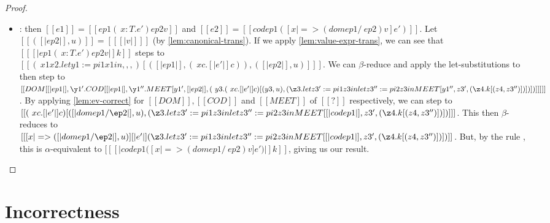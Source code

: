 \documentclass[11pt]{article}
\newcommand{\rrule}[1]{\rref*{#1}}
\begin{document}
\begin{proof}
\begin{itemize}
		\item \rrule{RedAppEv}: then $[[e1]] = [[ ep1 (\ x : T . e') ep2 v ]]$ and $[[e2]]=[[ cod ep1 ([x |=> (dom ep1 /\ ep2) v]e') ]]$.
		Let $[[( [|ep2|], u)]] = [[ [|v|] ]]$ (by \autoref{lem:canonical-trans}).
        If we apply \autoref{lem:value-expr-trans}, we can see that $[[  [|ep1 (\ x : T . e') ep2 v|]k ]]$
        steps to \\$[[ (\ x1  x2. let y1 := pi1 x1 in ,,,)[( [|ep1|] , (\ x c . [|e'|]c )), ( [|ep2|], u) ]  ]]$.
        We can $\beta$-reduce and apply the let-substitutions to then step to
        \\$[[ DOM [ [|ep1|] , \y1' . COD [  [|ep1|] , \y1''. MEET [y1', [|ep2|], (\ y3 . (\ x c . [|e'|]c ) [(y3, u), (\z3 . let z3' := pi1 z3 in let z3'' := pi2 z3 in MEET[y1'', z3', (\z4. k[(z4, z3'')] ) ] ) ] )] ] ] ]]$.
        By applying \autoref{lem:ev-correct} for $[[DOM]], [[COD]]$ and $[[MEET]]$ of $[[?]]$ respectively,
        we can step to  
        \\$[[  (\ x c . [|e'|]c ) [([|dom ep1 /\ep2|], u), (\z3 . let z3' := pi1 z3 in let z3'' := pi2 z3 in MEET[ [|cod ep1|] , z3', (\z4. k[(z4, z3'')] ) ] ) ] ]]$.
		This then $\beta$-reduces to 
		\\$[[  [ x |=> ([|dom ep1 /\ep2|], u) ][|e'|](\z3 . let z3' := pi1 z3 in let z3'' := pi2 z3 in MEET[ [|cod ep1|] , z3', (\z4. k[(z4, z3'')] ) ] ) ]]$.
		But, by the rule \rrule{TransformEv}, this is $\alpha$-equivalent to  $[[ [|cod ep1 ([x |=> (dom ep1 /\ ep2) v]e')|]k ]]$,
		giving us our result.
		 
	\end{itemize}
\end{proof}
 
\section{Incorrectness}
\end{document}
